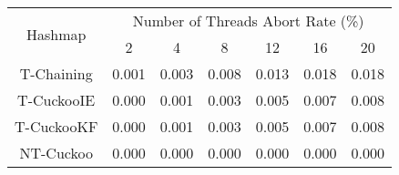 \begin{tabular}{|c|c|c|c|c|c|c|}
\hline
\multirow{2}{*}{Hashmap} & \multicolumn{6}{c|}{Number of Threads Abort Rate (\%)}\\\cline{2-7}& 2 & 4 & 8 & 12 & 16 & 20\\
\hline
\hline
T-Chaining & 0.001 & 0.003 & 0.008 & 0.013 & 0.018 & 0.018\\
T-CuckooIE & 0.000 & 0.001 & 0.003 & 0.005 & 0.007 & 0.008\\
T-CuckooKF & 0.000 & 0.001 & 0.003 & 0.005 & 0.007 & 0.008\\
NT-Cuckoo & 0.000 & 0.000 & 0.000 & 0.000 & 0.000 & 0.000\\
\hline
\end{tabular}
